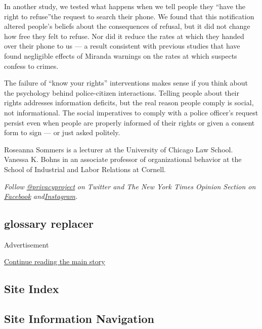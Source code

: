 In another study, we tested what happens when we tell people they ``have
the right to refuse''the request to search their phone. We found that
this notification altered people's beliefs about the consequences of
refusal, but it did not change how free they felt to refuse. Nor did it
reduce the rates at which they handed over their phone to us --- a
result consistent with previous studies that have found negligible
effects of Miranda warnings on the rates at which suspects confess to
crimes.

The failure of ``know your rights'' interventions makes sense if you
think about the psychology behind police-citizen interactions. Telling
people about their rights addresses information deficits, but the real
reason people comply is social, not informational. The social
imperatives to comply with a police officer's request persist even when
people are properly informed of their rights or given a consent form to
sign --- or just asked politely.

Roseanna Sommers is a lecturer at the University of Chicago Law School.
Vanessa K. Bohns in an associate professor of organizational behavior at
the School of Industrial and Labor Relations at Cornell.

\emph{Follow}
\href{https://twitter.com/privacyproject}{\emph{@privacyproject}}
\emph{on Twitter and The New York Times Opinion Section on}
\href{https://www.facebook.com/nytopinion}{\emph{Facebook}}
\emph{and}\href{https://www.instagram.com/nytopinion/}{\emph{Instagram}}\emph{.}

\hypertarget{glossary-replacer}{%
\subsection{glossary replacer}\label{glossary-replacer}}

Advertisement

\protect\hyperlink{after-bottom}{Continue reading the main story}

\hypertarget{site-index}{%
\subsection{Site Index}\label{site-index}}

\hypertarget{site-information-navigation}{%
\subsection{Site Information
Navigation}\label{site-information-navigation}}

